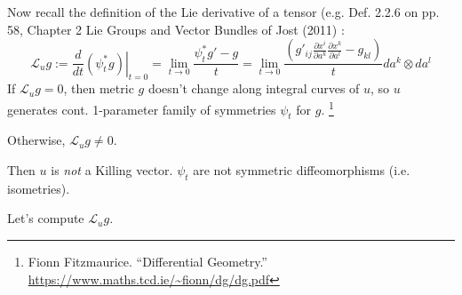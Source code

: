 \documentclass[twoside,landscape,10pt]{amsart}
\theoremstyle{plain}
\theoremstyle{definition}
\theoremstyle{remark}
\theoremstyle{remark}
\begin{document}
\begin{multicols*}{2}
Now recall the definition of the Lie derivative of a tensor (e.g. Def. 2.2.6 on pp. 58, Chapter 2 Lie Groups and Vector Bundles of Jost (2011) \cite{JJost2011}: 
\[
\mathcal{L}_ug := \frac{d}{dt} \left. (\psi_t^* g) \right|_{t=0} = \lim_{t\to 0 } \frac{ \psi_t^*g' - g}{t} = \lim_{t\to 0} \frac{ \left( g'_{ij} \frac{ \partial x^i}{ \partial a^k } \frac{ \partial x^k}{ \partial a^l } - g_{kl} \right) }{ t} da^k \otimes da^l
\]
If $\mathcal{L}_ug = 0$, then metric $g$ doesn't change along integral curves of $u$, so $u$ generates cont. 1-parameter family of symmetries $\psi_t$ for $g$.  \footnote{Fionn Fitzmaurice. ``Differential Geometry.''  \url{https://www.maths.tcd.ie/~fionn/dg/dg.pdf} }

Otherwise, $\mathcal{L}_ug\neq 0$.  

Then $u$ is \emph{not} a Killing vector.  $\psi_t$ are not symmetric diffeomorphisms (i.e. isometries).  

Let's compute $\mathcal{L}_ug$.  


\end{multicols*}
\end{document}
